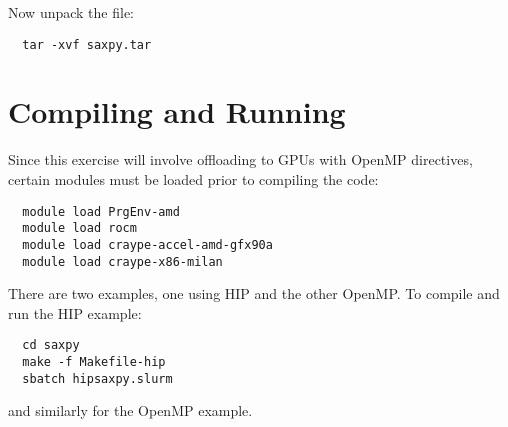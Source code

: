 \documentclass{article}
\begin{document}
\noindent Now unpack the file:
\begin{verbatim}
  tar -xvf saxpy.tar
\end{verbatim}

\section{Compiling and Running}

Since this exercise will involve offloading to GPUs with OpenMP
directives, certain modules must be loaded prior to compiling the
code:

\begin{verbatim}
  module load PrgEnv-amd
  module load rocm
  module load craype-accel-amd-gfx90a
  module load craype-x86-milan
\end{verbatim}

\noindent There are two examples, one using HIP and the other OpenMP. To compile and run the HIP example:

\begin{verbatim}
  cd saxpy
  make -f Makefile-hip
  sbatch hipsaxpy.slurm
\end{verbatim}

\noindent and similarly for the OpenMP example.
\end{document}
